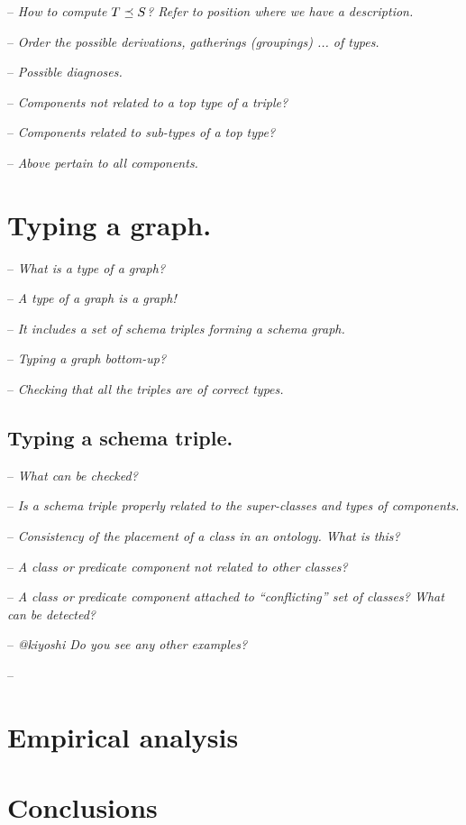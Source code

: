 \documentclass[runningheads]{llncs}
\newcommand{\nl}{\hfill\break}
\newcommand{\notes}[1]{\noindent\begin{small}-- \emph{#1}\\\end{small}}
\begin{document}
\medskip

\medskip
\notes{How to compute $T\preceq\/S$? Refer to position where we have a description.}
\notes{Order the possible derivations, gatherings (groupings) ... of types.}

\notes{Possible diagnoses.}
\notes{Components not related to a top type of a triple?}
\notes{Components related to sub-types of a top type?}
\notes{Above pertain to all components.}





\section{Typing a graph.}\nl

\notes{What is a type of a graph?}
\notes{A type of a graph is a graph!}
\notes{It includes a set of schema triples forming a schema graph.}

\notes{Typing a graph bottom-up?}
\notes{Checking that all the triples are of correct types.}


\subsection{Typing a schema triple.}\nl

\notes{What can be checked?}
\notes{Is a schema triple properly related to the super-classes and types of components.}
\notes{Consistency of the placement of a class in an ontology. What is this?}
\notes{A class or predicate component not related to other classes?}
\notes{A class or predicate component attached to ``conflicting'' set of classes? What can be detected?}
\notes{@kiyoshi Do you see any other examples?}
\notes{}





\section{Empirical analysis}




\section{Conclusions}



%



\end{document}

